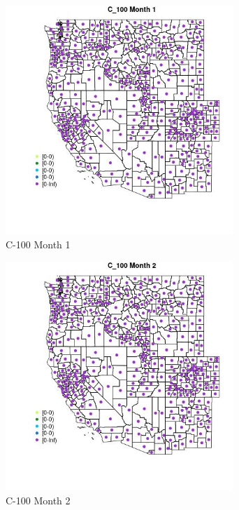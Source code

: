 \begin{figure} 
\centering  
\includegraphics[width=0.77\textwidth]{Code_Outputs/df_report_ML_predictors_CountyCentroid_Locations_Dates_2008-01-01to2018-12-31_MapObsMo1C_100.jpg} 
\caption{\label{fig:df_report_ML_predictors_CountyCentroid_Locations_Dates_2008-01-01to2018-12-31MapObsMo1C_100}C-100 Month 1} 
\end{figure} 
 

\begin{figure} 
\centering  
\includegraphics[width=0.77\textwidth]{Code_Outputs/df_report_ML_predictors_CountyCentroid_Locations_Dates_2008-01-01to2018-12-31_MapObsMo2C_100.jpg} 
\caption{\label{fig:df_report_ML_predictors_CountyCentroid_Locations_Dates_2008-01-01to2018-12-31MapObsMo2C_100}C-100 Month 2} 
\end{figure} 
 

